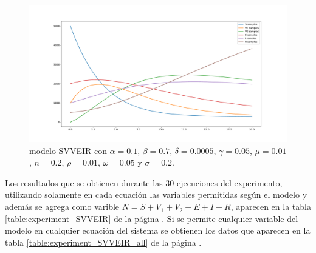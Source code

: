 \begin{figure}[h]
    \centering
    \includegraphics[width=\textwidth]{"figures/SVVEIR.pdf"}
    \caption{modelo SVVEIR con $\alpha = 0.1$, $\beta = 0.7$, $\delta = 0.0005$, $\gamma = 0.05$, $\mu = 0.01$, $n = 0.2$, $\rho = 0.01$, $\omega = 0.05$ y $\sigma = 0.2$.}
    \label{fig:SVVEIR}
\end{figure}

Los resultados que se obtienen durante las 30 ejecuciones del experimento, utilizando solamente en cada ecuación las variables permitidas según el modelo y además se agrega como varible $N=S + V_1 + V_2 + E + I + R$, aparecen en la tabla \ref{table:experiment_SVVEIR} de la página \pageref{table:experiment_SVVEIR}. Si se permite cualquier variable del modelo en cualquier ecuación del sistema se obtienen los datos que aparecen en la tabla \ref{table:experiment_SVVEIR_all} de la página \pageref{table:experiment_SVVEIR_all}.

